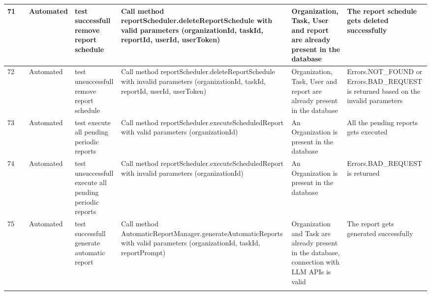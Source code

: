 \documentclass{article}
\begin{document}
{\begin{tabular}{|
    >{\columncolor[HTML]{FFFFFF}}l |
    >{\columncolor[HTML]{FFFFFF}}c |
    >{\columncolor[HTML]{FFFFFF}}l |l|l|l|l|}
    71          & \cellcolor[HTML]{FFFFFF}                                      & {\color[HTML]{11734B} Automated} & test successfull remove report schedule                 & Call method reportScheduler.deleteReportSchedule with valid parameters (organizationId, taskId, reportId, userId, userToken)                              & Organization, Task, User and report are already present in the database                            & The report schedule gets deleted successfully                                        \\ \cline{1-1} \cline{3-7} 
    72          & \cellcolor[HTML]{FFFFFF}                                      & {\color[HTML]{11734B} Automated} & test unsuccessfull remove report schedule               & Call method reportScheduler.deleteReportSchedule with invalid parameters (organizationId, taskId, reportId, userId, userToken)                            & Organization, Task, User and report are already present in the database                            & Errors.NOT\_FOUND or Errors.BAD\_REQUEST is returned based on the invalid parameters \\ \cline{1-1} \cline{3-7} 
    73          & \cellcolor[HTML]{FFFFFF}                                      & {\color[HTML]{11734B} Automated} & test execute all pending periodic reports               & \cellcolor[HTML]{FFFFFF}Call method reportScheduler.executeScheduledReport with valid parameters (organizationId)                                         & An Organization is present in the database                                                         & All the pending reports gets executed                                                \\ \cline{1-1} \cline{3-7} 
    74          & \cellcolor[HTML]{FFFFFF}                                      & {\color[HTML]{11734B} Automated} & test unsuccessfull execute all pending periodic reports & \cellcolor[HTML]{FFFFFF}Call method reportScheduler.executeScheduledReport with invalid parameters (organizationId)                                       & An Organization is present in the database                                                         & Errors.BAD\_REQUEST is returned                                                      \\ \cline{1-1} \cline{3-7} 
    75          & \cellcolor[HTML]{FFFFFF}                                      & {\color[HTML]{11734B} Automated} & test successfull generate automatic report              & Call method AutomaticReportManager.generateAutomaticReports with valid parameters (organizationId, taskId, reportPrompt)                                  & Organization and Task are already present in the database, connection with LLM APIs is valid       & The report gets generated successfully                                               \\ \cline{1-1} \cline{3-7} 

\end{tabular}}
\end{document}
